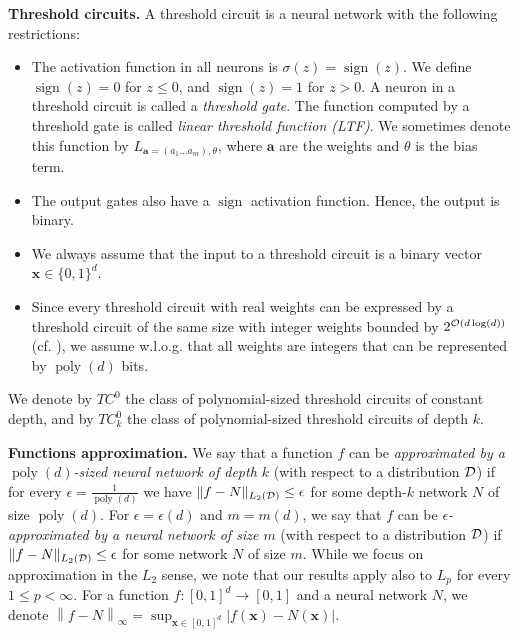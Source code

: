 \documentclass[11pt]{article}
\newcommand{\ba}{\mathbf{a}}
\newcommand{\bx}{\mathbf{x}}
\newcommand{\co}{{\cal O}}
\newcommand{\cd}{{\cal D}}
\DeclareMathOperator*{\sign}{sign}
\DeclareMathOperator{\poly}{poly}
\DeclareMathOperator*{\E}{\mathbb{E}}
\newcommand{\norm}[1]{\left\|#1\right\|}
\newcommand{\snorm}[1]{\|#1\|} %
\begin{document}
\textbf{Threshold circuits.}
A threshold circuit is a neural network with the following restrictions:
\begin{itemize}
	\item The activation function in all neurons is $\sigma(z) = \sign(z)$. We define $\sign(z)=0$ for $z \leq 0$, and $\sign(z)=1$ for $z > 0$. A neuron in a threshold circuit is called a {\em threshold gate}. 
	The function computed by a threshold gate is called {\em linear threshold function (LTF)}. 
	We sometimes denote this function by $L_{\ba=(a_1 \ldots a_m), \theta}$, where $\ba$ are the weights and $\theta$ is the bias term.
	\item The output gates also have a $\sign$ activation function. Hence, the output is binary.
	\item We always assume that the input to a threshold circuit is a binary vector $\bx \in \{0,1\}^d$.
	\item Since every threshold circuit with real weights can be expressed by a threshold circuit of the same size with integer weights bounded by $2^{\co(d \log(d))}$ (cf. \cite{goldmann1998simulating}), we assume w.l.o.g. that all weights are integers that can be represented by $\poly(d)$ bits.
\end{itemize}
We denote by $TC^0$ the class of polynomial-sized threshold circuits of constant depth, and by $TC^0_k$ the class of polynomial-sized threshold circuits of depth $k$.


\textbf{Functions approximation.}
We say that a function $f$ can be {\em approximated by a $\poly(d)$-sized neural network of depth $k$} (with respect to a distribution $\cd$) if for every $\epsilon=\frac{1}{\poly(d)}$ we have 
$\snorm{f-N}_{L_2(\cd)} \leq \epsilon$ 
for some depth-$k$ network $N$ of size $\poly(d)$.
%
For $\epsilon=\epsilon(d)$ and $m=m(d)$,
we say that $f$ can be {\em $\epsilon$-approximated by a neural network of size $m$} (with respect to a distribution $\cd$) if 
$\snorm{f-N}_{L_2(\cd)} \leq \epsilon$
for some network $N$ of size $m$.
%
While we focus on approximation in the $L_2$ sense, we note that our results apply also to $L_p$ for every $1 \leq p < \infty$.
%
For a function $f:[0,1]^d \rightarrow [0,1]$ and a neural network $N$, we denote $\norm{f-N}_\infty=\sup_{\bx \in [0,1]^d}|f(\bx)-N(\bx)|$.
\end{document}

